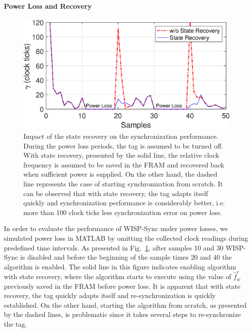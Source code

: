 \documentclass[journal,draftcls,onecolumn,12pt,twoside]{IEEEtranTCOM}
\begin{document}
\paragraph{Power Loss and Recovery}

\begin{figure}
\centering
\includegraphics[scale=0.35]{figures/power_loss.eps}
\caption{\label{fig:power_loss}Impact of the state recovery on the synchronization performance. During the power loss periods, the tag is assumed to be turned off. With state recovery, presented by the solid line, the relative clock frequency is assumed to be saved in the FRAM and recovered back when sufficient power is supplied. On the other hand, the dashed line represents the case of starting synchronization from scratch. It can be observed that with state recovery, the tag adapts itself quickly and synchronization performance is considerably better, i.e. more than 100 clock ticks less synchronization error on power loss.} 
\end{figure}

In order to evaluate the performance of WISP-Sync under power losses, we simulated power loss in MATLAB by omitting the collected clock readings during predefined time intervals. As presented in Fig.~\ref{fig:power_loss}, after samples 10 and 30 WISP-Sync is disabled and before the beginning of the sample times 20 and 40 the algorithm is enabled. The solid line in this figure indicates enabling algorithm with state recovery, where the algorithm starts to execute using the value of $\hat{f}_w^r$  previously saved in the FRAM before power loss. It is apparent that with state recovery, the tag quickly adapts itself and re-synchronization is quickly established. On the other hand, starting the algorithm from scratch, as presented by the dashed lines, is problematic since it takes several steps to re-synchronize the tag.
%
%		
%
\end{document}
